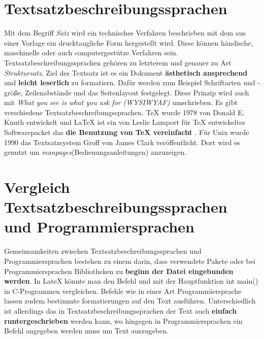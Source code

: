 \section{Textsatzbeschreibungssprachen}
Mit dem Begriff \textit{Satz} wird ein technisches Verfahren beschrieben mit dem aus einer Vorlage ein drucktaugliche Form hergestellt wird. Diese können händische, maschinelle oder auch computergestütze Verfahren sein. Textsatzbeschreibungssprachen gehören zu letzterem und genauer zu Art \textit{Struktursatz}. Ziel des Textsatz ist es ein Dokument \textbf{ästhetisch ansprechend} und \textbf{leicht leserlich} zu formatiern. Dafür werden zum Beispiel Schriftarten und -größe, Zeilenabstände und das Seitenlayout festgelegt\nocite{satzwiki:2023}. Diese Prinzip wird auch mit \textit{What you see is what you ask for (WYSIWYAF)} umschrieben.
Es gibt verschiedene Textsatzbeschreibungssprachen. TeX wurde 1978 von Donald E. Knuth entwickelt und LaTeX ist ein von Leslie Lamport für TeX entwickeltes Softwarepacket das \textbf{die Benutzung von TeX vereinfacht}\nocite{tex:2023} \nocite{latex:2023}. Für Unix wurde 1990 das Textsatzsystem Groff von James Clark veröffentlicht. Dort wird es genutzt um \textit{manpages}(Bedienungsanleitungen) anzuzeigen\nocite{groff:2022}.

\section{Vergleich Textsatzbeschreibungssprachen und Programmiersprachen}
Gemeinsamkeiten zwischen Textsatzbeschreibungssprachen und Programmiersprachen bestehen zu einem darin, dass verwendete Pakete oder bei Programmiersprachen Bibliotheken zu \textbf{beginn der Datei eingebunden werden}. In LateX könnte man den Befehl   und  mit der Hauptfunktion int main(){ } in C-Programmen vergleichen. Befehle wie in einer Art Programmiersprache lassen zudem bestimmte formatierungen auf den Text ausführen.
Unterschiedlich ist allerdings das in Textsatzbeschreibungssprachen der Text auch \textbf{einfach runtergeschrieben} werden kann, wo hingegen in Programmiersprachen ein Befehl angegeben werden muss um Text auszugeben.

